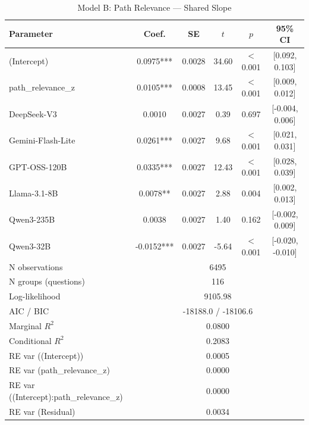 \begin{table}[htbp]
\centering
\small
\caption{Model B: Path Relevance --- Shared Slope}
\label{tab:lme_model_b_shared_table}
\begin{tabular}{lccccc}
\toprule
Parameter & Coef. & SE & $t$ & $p$ & 95\% CI \\
\midrule
  (Intercept) & 0.0975*** & 0.0028 & 34.60 & $<$0.001 & [0.092, 0.103] \\
  path\_relevance\_z & 0.0105*** & 0.0008 & 13.45 & $<$0.001 & [0.009, 0.012] \\
  DeepSeek-V3 & 0.0010 & 0.0027 & 0.39 & 0.697 & [-0.004, 0.006] \\
  Gemini-Flash-Lite & 0.0261*** & 0.0027 & 9.68 & $<$0.001 & [0.021, 0.031] \\
  GPT-OSS-120B & 0.0335*** & 0.0027 & 12.43 & $<$0.001 & [0.028, 0.039] \\
  Llama-3.1-8B & 0.0078** & 0.0027 & 2.88 & 0.004 & [0.002, 0.013] \\
  Qwen3-235B & 0.0038 & 0.0027 & 1.40 & 0.162 & [-0.002, 0.009] \\
  Qwen3-32B & -0.0152*** & 0.0027 & -5.64 & $<$0.001 & [-0.020, -0.010] \\
\midrule
  N observations & \multicolumn{5}{c}{6495} \\
  N groups (questions) & \multicolumn{5}{c}{116} \\
  Log-likelihood & \multicolumn{5}{c}{9105.98} \\
  AIC / BIC & \multicolumn{5}{c}{-18188.0 / -18106.6} \\
  Marginal $R^2$ & \multicolumn{5}{c}{0.0800} \\
  Conditional $R^2$ & \multicolumn{5}{c}{0.2083} \\
  RE var ((Intercept)) & \multicolumn{5}{c}{0.0005} \\
  RE var (path\_relevance\_z) & \multicolumn{5}{c}{0.0000} \\
  RE var ((Intercept):path\_relevance\_z) & \multicolumn{5}{c}{0.0000} \\
  RE var (Residual) & \multicolumn{5}{c}{0.0034} \\
\bottomrule
\end{tabular}
\end{table}
